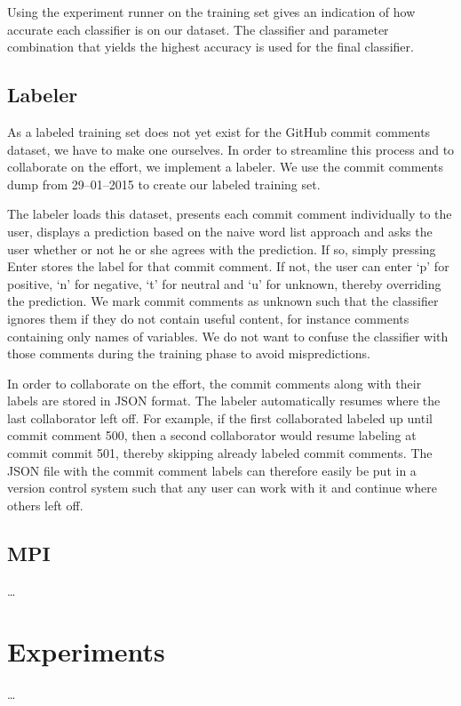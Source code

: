 \documentclass{article}
\begin{document}
Using the experiment runner on the training set gives an indication of
how accurate each classifier is on our dataset. The classifier and
parameter combination that yields the highest accuracy is used for the
final classifier.

\subsection{Labeler}\label{sec:labeler}
As a labeled training set does not yet exist for the GitHub commit comments
dataset, we have to make one ourselves. In order to streamline this process
and to collaborate on the effort, we implement a labeler. We use the commit
comments dump from 29--01--2015 to create our labeled training set.

The labeler loads this dataset, presents each commit comment individually to
the user, displays a prediction based on the naive word list approach and asks
the user whether or not he or she agrees with the prediction. If so, simply
pressing Enter stores the label for that commit comment. If not, the user
can enter `p' for positive, `n' for negative, `t' for neutral and `u' for
unknown, thereby overriding the prediction. We mark commit comments as unknown
such that the classifier ignores them if they do not contain useful content,
for instance comments containing only names of variables. We do not want to
confuse the classifier with those comments during the training phase to avoid
mispredictions.

In order to collaborate on the effort, the commit comments along with their
labels are stored in JSON format. The labeler automatically resumes where
the last collaborator left off. For example, if the first collaborated labeled
up until commit comment 500, then a second collaborator would resume labeling
at commit commit 501, thereby skipping already labeled commit comments. The
JSON file with the commit comment labels can therefore easily be put in a
version control system such that any user can work with it and continue where
others left off.

\subsection{MPI}\label{sec:mpi}
\ldots

\section{Experiments}\label{sec:experiments}
\ldots
\end{document}
